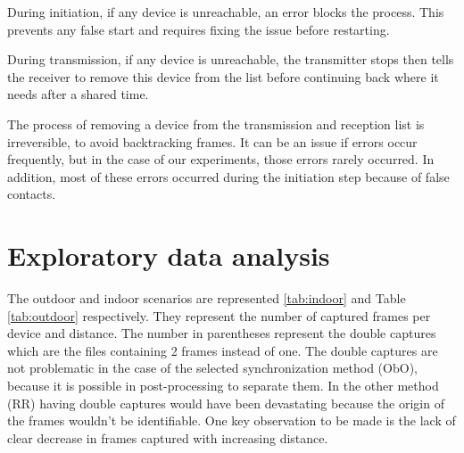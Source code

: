 \documentclass[a4paper, 12pt]{article}
\begin{document}
During initiation, if any device is unreachable, an error blocks the process. This prevents any false start and requires fixing the issue before restarting.

During transmission, if any device is unreachable, the transmitter stops then tells the receiver to remove this device from the list before continuing back where it needs after a shared time.

The process of removing a device from the transmission and reception list is irreversible, to avoid backtracking frames. It can be an issue if errors occur frequently, but in the case of our experiments, those errors rarely occurred. In addition, most of these errors occurred during the initiation step because of false contacts.

\section{Exploratory data analysis}\label{Res}

The outdoor and indoor scenarios are represented \ref{tab:indoor} and Table \ref{tab:outdoor} respectively.
They represent the number of captured frames per device and distance.
The number in parentheses represent the double captures which are the files containing 2 frames instead of one.
The double captures are not problematic in the case of the selected synchronization method (ObO), because it is possible in post-processing to separate them. In the other method (RR) having double captures would have been devastating because the origin of the frames wouldn’t be identifiable.
One key observation to be made is
the lack of clear decrease in frames captured with increasing distance.
\end{document}

